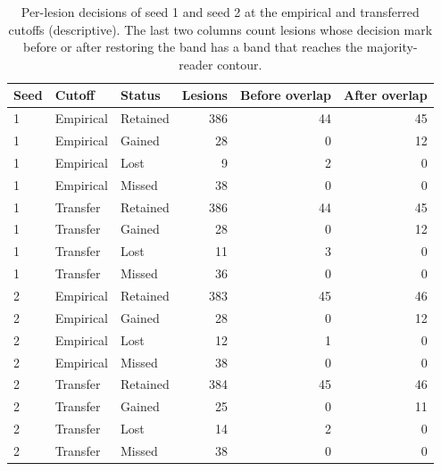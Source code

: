 \begin{table}[!t]
\centering
\footnotesize\setlength{\tabcolsep}{4pt}
\caption{Per-lesion decisions of seed 1 and seed 2 at the empirical and transferred cutoffs (descriptive). The last two columns count lesions whose decision mark before or after restoring the band has a band that reaches the majority-reader contour.}
\label{tab:decision}
\begin{tabular}{@{}lllrrr@{}}
\toprule
Seed & Cutoff & Status & Lesions & Before overlap & After overlap \\
\midrule
1 & Empirical & Retained & 386 & 44 & 45 \\
1 & Empirical & Gained & 28 & 0 & 12 \\
1 & Empirical & Lost & 9 & 2 & 0 \\
1 & Empirical & Missed & 38 & 0 & 0 \\
\midrule
1 & Transfer & Retained & 386 & 44 & 45 \\
1 & Transfer & Gained & 28 & 0 & 12 \\
1 & Transfer & Lost & 11 & 3 & 0 \\
1 & Transfer & Missed & 36 & 0 & 0 \\
\midrule
2 & Empirical & Retained & 383 & 45 & 46 \\
2 & Empirical & Gained & 28 & 0 & 12 \\
2 & Empirical & Lost & 12 & 1 & 0 \\
2 & Empirical & Missed & 38 & 0 & 0 \\
\midrule
2 & Transfer & Retained & 384 & 45 & 46 \\
2 & Transfer & Gained & 25 & 0 & 11 \\
2 & Transfer & Lost & 14 & 2 & 0 \\
2 & Transfer & Missed & 38 & 0 & 0 \\
\bottomrule
\end{tabular}
\end{table}
